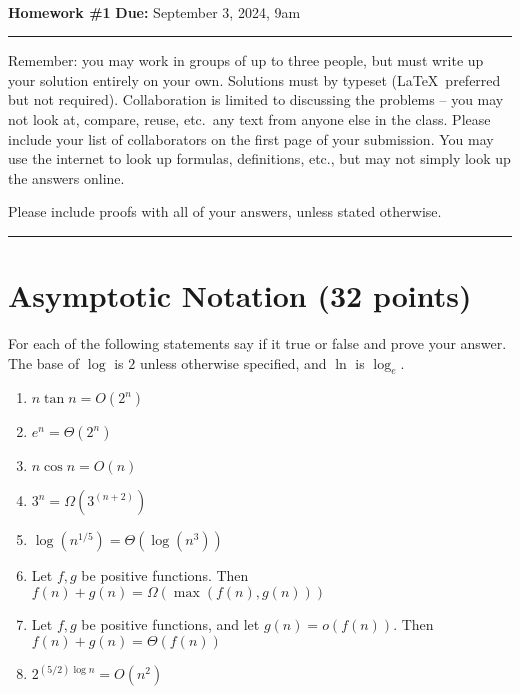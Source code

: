 \documentclass[11pt]{article}
\begin{document}
\\
{{\bf Homework \#1}} \hfill {{\bf Due:} September 3, 2024, 9am} \\
\rule[0.1in]{\textwidth}{0.4pt}

Remember: you may work in groups of up to three people, but must write up your solution entirely on your own.  Solutions must by typeset (\LaTeX\ preferred but not required).  Collaboration is limited to discussing the problems -- you may not look at, compare, reuse, etc.~any text from anyone else in the class.  Please include your list of collaborators on the first page of your submission.  You may use the internet to look up formulas, definitions, etc., but may not simply look up the answers online.  

Please include proofs with all of your answers, unless stated otherwise.

\noindent \rule[0.1in]{\textwidth}{0.4pt}

\section{Asymptotic Notation (32 points)}

For each of the following statements say if it true or false and prove your answer.  The base of $\log$ is $2$ unless otherwise specified, and $\ln$ is $\log_e$.

\begin{enumerate}
\item  $n \tan n = O(2^n)$

\item $e^n = \Theta(2^{n})$
  
\item $n \cos n = O(n)$
  
\item $3^n = \Omega(3^{(n+2)})$

\item $\log(n^{1/5}) = \Theta(\log (n^{3}))$

\item Let $f,g$ be positive functions. Then $f(n)+g(n) = \Omega(\max(f(n),g(n)))$

\item Let $f,g$ be positive functions, and let $g(n) = o(f(n))$. Then $f(n)+g(n) = \Theta(f(n))$ 

\item $2^{(5/2) \log n} = O(n^2)$

\end{enumerate}
\end{document}
